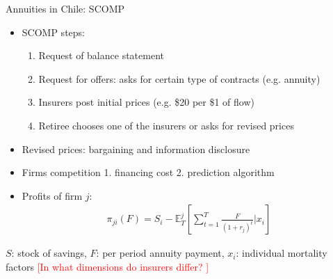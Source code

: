 \documentclass[10pt,aspectratio=169]{beamer}
\begin{document}
\begin{frame}{Annuities in Chile: SCOMP}  \label{slide:setting}
       
    \begin{itemize}%
    \item SCOMP steps: 
    \begin{enumerate}
        \item Request of balance statement 
        \item Request for offers: asks for certain type of contracts (e.g. annuity)
        \item Insurers post initial prices (e.g. \$20 per \$1 of flow) \hyperlink{slide:fig5}{}
        \item Retiree chooses one of the insurers or asks for revised prices

    \end{enumerate}

        \item Revised prices: bargaining and information disclosure
        

    \item Firms competition 1. financing cost 2. prediction algorithm 

    \item Profits of firm $j$: 
    \begin{align*}
    \pi_{ji}(F) = S_i-  \mathbb{E}^j_{T} \left[\sum_{t=1}^T\frac{F}{(1+r_j)^t}|x_i \right]
    \end{align*}
    \end{itemize}

     $S$: stock of savings, $F$: per period annuity payment, $x_i$: individual mortality factors
    \textcolor{red}{[In what dimensions do insurers differ? ]}
\end{frame}

\end{document}
